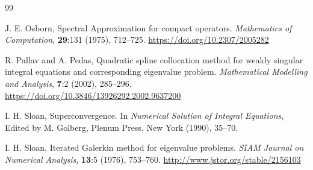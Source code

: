 \documentclass[]{interact}
\theoremstyle{plain}%
\theoremstyle{definition}
\theoremstyle{remark}
\begin{document}
\begin{thebibliography}{99}
	
	
	J. E. Osborn, Spectral Approximation for compact operators. \textit{Mathematics of Computation}, \textbf{29}:131 (1975), 712--725. 
	\url{https://doi.org/10.2307/2005282}
	
	R. Pallav and A. Pedas, Quadratic spline collocation method for weakly singular integral equations and corresponding eigenvalue problem. \textit{Mathematical Modelling and Analysis}, \textbf{7}:2 (2002), 285--296.
	\url{https://doi.org/10.3846/13926292.2002.9637200}
	
	
	I. H. Sloan, Superconvergence. In \textit{Numerical Solution of Integral Equations}, Edited by M. Golberg, Plenum Press, New York (1990), 35--70.
	
	I. H. Sloan, Iterated Galerkin method for eigenvalue problems. \textit{SIAM Journal on Numerical Analysis}, \textbf{13}:5 (1976), 753--760.
	\url{http://www.jstor.org/stable/2156103}
	
\end{thebibliography}
\end{document}

